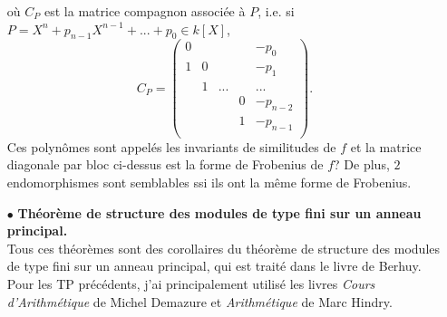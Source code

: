 \begin{itemize}
où $C_P$ est la matrice compagnon associée à $P$, i.e. si $P=X^n+p_{n-1}X^{n-1}+...+p_0\in k[X]$,
\[C_P=\begin{pmatrix}
0 &    &  & & -p_0\\
1 & 0 &   &  &-p_1\\
 &    1 & ...  &  &...\\
&      &      & 0  &  -p_{n-2} \\
&       &    &  1 &  -p_{n-1}  \\ 
\end{pmatrix}.\]
Ces polynômes sont appelés les invariants de similitudes de $f$ et la matrice diagonale par bloc ci-dessus est la forme de Frobenius de $f$? De plus, $2$ endomorphismes sont semblables ssi ils ont la même forme de Frobenius.
\item[$\bullet$] \textbf{Théorème de structure des modules de type fini sur un anneau principal.}\\ Tous ces théorèmes sont des corollaires du théorème de structure des modules de type fini sur un anneau principal, qui est traité dans le livre de Berhuy. Pour les TP précédents, j'ai principalement utilisé les livres \textit{Cours d'Arithmétique} de Michel Demazure et  \textit{Arithmétique} de Marc Hindry.
 
\end{itemize}

